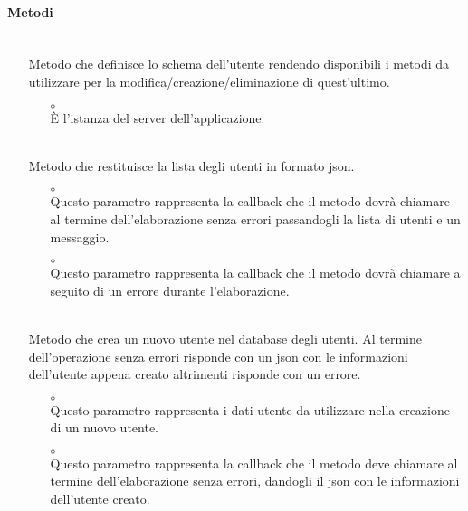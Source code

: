 \paragraph*{Metodi}
\begin{itemize}
\item[]  \\ Metodo che definisce lo schema  dell'utente rendendo disponibili i metodi da utilizzare per la modifica/creazione/eliminazione di quest'ultimo.
\begin{itemize}\addtolength{\itemsep}{-0.5\baselineskip}
\item[$\circ$]  \\ È l'istanza del server dell'applicazione.
\end{itemize}
\item[]  \\ Metodo che restituisce la lista degli utenti in formato json.
\begin{itemize}\addtolength{\itemsep}{-0.5\baselineskip}
\item[$\circ$]  \\ Questo parametro rappresenta la callback che il metodo dovrà chiamare al termine dell'elaborazione senza errori passandogli la lista di utenti e un messaggio.
\item[$\circ$]  \\ Questo parametro rappresenta la callback che il metodo dovrà chiamare a seguito di un errore durante l'elaborazione.
\end{itemize}
\item[]  \\ Metodo che crea un nuovo utente nel database degli utenti. Al termine dell'operazione senza errori risponde con un json con le informazioni dell'utente appena creato altrimenti risponde con un errore. 
\begin{itemize}\addtolength{\itemsep}{-0.5\baselineskip}
\item[$\circ$]  \\ Questo parametro rappresenta i dati utente da utilizzare nella creazione di un nuovo utente.
\item[$\circ$]  \\ Questo parametro rappresenta la callback che il metodo deve chiamare al termine dell'elaborazione senza errori, dandogli il json con le informazioni dell'utente creato.

\end{itemize}
\end{itemize}
